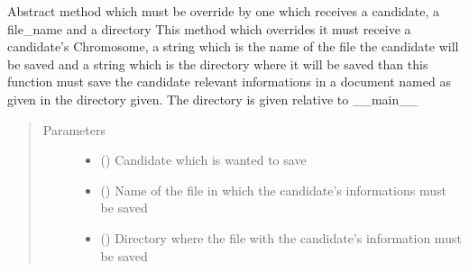 \documentclass[letterpaper,10pt,english]{sphinxmanual}
\begin{document}
\begin{fulllineitems}
\begin{fulllineitems}
\label{\detokenize{genetic:genetic.Genetic.save}}
\sphinxAtStartPar
Abstract method which must be override by one which receives a candidate, a file\_name and a directory
This method which overrides it must receive a candidate’s Chromosome, a string which is the name of the file
the candidate will be saved and a string which is the directory where it will be saved than this function must
save the candidate relevant informations in a document named as given in the directory given. The directory is
given relative to \_\_main\_\_
\begin{quote}\begin{description}
\item[{Parameters}] \leavevmode\begin{itemize}
\item {} 
\sphinxAtStartPar
{} ({\hyperref[\detokenize{genetic:genetic.Chromosome}]{}}) \textendash{} Candidate which is wanted to save

\item {} 
\sphinxAtStartPar
{} () \textendash{} Name of the file in which the candidate’s informations must be saved

\item {} 
\sphinxAtStartPar
{} () \textendash{} Directory where the file with the candidate’s information must be saved

\end{itemize}

\end{description}\end{quote}

\end{fulllineitems}


\end{fulllineitems}
\end{document}
